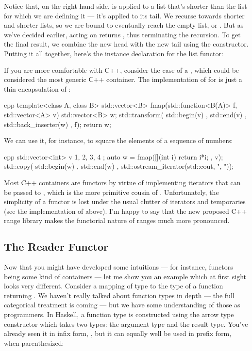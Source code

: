 Notice that, on the right hand side,  is applied to a
list that's shorter than the list for which we are defining it --- it's
applied to its tail. We recurse towards shorter and shorter lists, so we
are bound to eventually reach the empty list, or . But as
we've decided earlier,  acting on  returns
, thus terminating the recursion. To get the final result,
we combine the new head  with the new tail
 using the  constructor. Putting it
all together, here's the instance declaration for the list functor:

If you are more comfortable with C++, consider the case of a
, which could be considered the most generic C++
container. The implementation of  for 
is just a thin encapsulation of :

\begin{snip}{cpp}
template<class A, class B>
std::vector<B> fmap(std::function<B(A)> f, std::vector<A> v) {
    std::vector<B> w;
    std::transform( std::begin(v)
                  , std::end(v)
                  , std::back_inserter(w)
                  , f); 
    return w;
}
\end{snip}
We can use it, for instance, to square the elements of a sequence of
numbers:

\begin{snip}{cpp}
std::vector<int> v{ 1, 2, 3, 4 };
auto w = fmap([](int i) { return i*i; }, v);
std::copy( std::begin(w)
         , std::end(w)
         , std::ostream_iterator(std::cout, ", "));
\end{snip}
Most C++ containers are functors by virtue of implementing iterators
that can be passed to , which is the more
primitive cousin of . Unfortunately, the simplicity of a
functor is lost under the usual clutter of iterators and temporaries
(see the implementation of  above). I'm happy to say that
the new proposed C++ range library makes the functorial nature of ranges
much more pronounced.

\subsection{The Reader Functor}

Now that you might have developed some intuitions --- for instance,
functors being some kind of containers --- let me show you an example
which at first sight looks very different. Consider a mapping of type
 to the type of a function returning . We haven't
really talked about function types in depth --- the full categorical
treatment is coming --- but we have some understanding of those as
programmers. In Haskell, a function type is constructed using the arrow
type constructor \code{(->)} which takes two types: the
argument type and the result type. You've already seen it in infix form,
, but it can equally well be used in prefix
form, when parenthesized:

